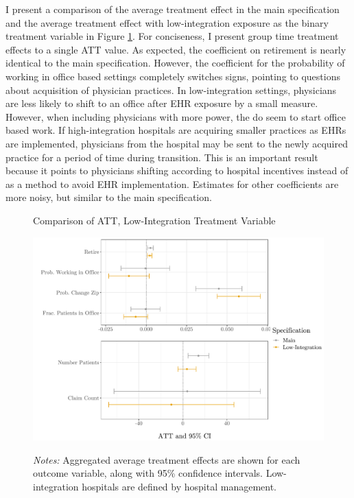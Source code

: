 \documentclass[11pt]{article}
\begin{document}
I present a comparison of the average treatment effect in the main specification and the average treatment effect with low-integration exposure as the binary treatment variable in Figure \ref{fig:LI}. For conciseness, I present group time treatment effects to a single ATT value. As expected, the coefficient on retirement is nearly identical to the main specification. However, the coefficient for the probability of working in office based settings completely switches signs, pointing to questions about acquisition of physician practices. In low-integration settings, physicians are less likely to shift to an office after EHR exposure by a small measure. However, when including physicians with more power, the do seem to start office based work. If high-integration hospitals are acquiring smaller practices as EHRs are implemented, physicians from the hospital may be sent to the newly acquired practice for a period of time during transition. This is an important result because it points to physicians shifting according to hospital incentives instead of as a method to avoid EHR implementation. Estimates for other coefficients are more noisy, but similar to the main specification. 

\begin{figure}[ht]
    \centering
    \captionsetup{width=.57\linewidth}
    \caption{Comparison of ATT, Low-Integration Treatment Variable}
    \includegraphics[scale=.57]{Objects/LI_graph.pdf}
    \label{fig:LI}
    \vspace{2mm}
    \caption*{\footnotesize{\textit{Notes:} Aggregated average treatment effects are shown for each outcome variable, along with 95\% confidence intervals. Low-integration hospitals are defined by hospital management.}}
\end{figure}
\end{document}
